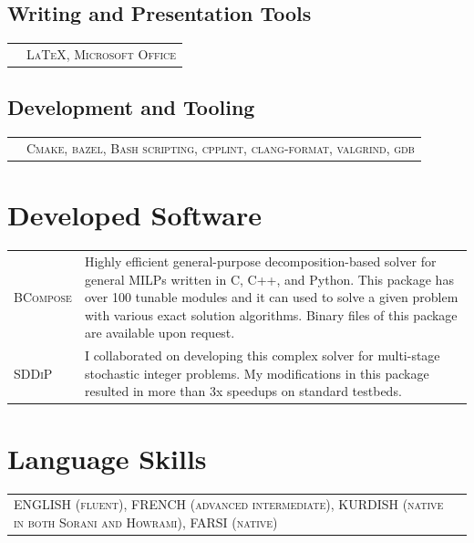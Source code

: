 \documentclass[10PT,letter]{article}
\newcommand{\subsectionstyle}[1]{\normalfont\selectfont\textcolor{titlecol}{\sffamily #1}}
\newcommand{\numbox}[1]{} %
\begin{document}
		\subsection*{\subsectionstyle{Writing and Presentation Tools}}
				\begin{tabular}{p{.2in}p{5.55in}}
					 & \textsc{\LaTeX, Microsoft Office}
				\end{tabular}

        \subsection*{\subsectionstyle{Development and Tooling}}
        		\begin{tabular}{p{.2in}p{5.55in}}
        			& 	\textsc{Cmake, bazel, Bash scripting,  cpplint, clang-format, valgrind, gdb} 
        		\end{tabular}


\section*{\numbox{9}\bfseries\textcolor{titlecol}{\sffamily Developed Software}}
			\begin{tabular}{p{1.2in}p{5.55in}}
				\textsc{BCompose} &  
												Highly efficient general-purpose decomposition-based solver for general MILPs written in C, C++, and Python. This package has over 100 tunable modules and it can used to solve a given problem with various exact solution algorithms. 
												Binary files of this package are available upon request.\\[.5mm]
				\textsc{SDDiP} & 
												I collaborated on developing  this complex solver for multi-stage stochastic integer problems. My modifications in this package resulted in more than 3x speedups  on  standard  testbeds. %
			\end{tabular}

\section*{\numbox{9}\bfseries\textcolor{titlecol}{\sffamily Language Skills}}

	\begin{tabular}{p{7.2in}p{5.55in}}
		\textsc{ENGLISH (fluent),   FRENCH (advanced intermediate),  KURDISH (native in both Sorani and Howrami), FARSI (native)} & \\[.5mm]
	\end{tabular}
\end{document}
